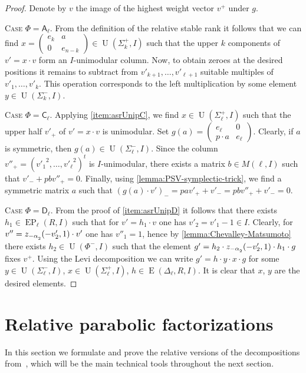 \documentclass[11pt]{amsart}
\theoremstyle{plain}
\numberwithin{equation}{section}
\numberwithin{lemma}{section}
\theoremstyle{definition}
\theoremstyle{remark}
\DeclareMathOperator{\E}{E}
\DeclareMathOperator{\EP}{EP}
\DeclareMathOperator{\U}{U}
\newcommand{\rA}{\mathsf{A}}
\newcommand{\rC}{\mathsf{C}}
\newcommand{\rD}{\mathsf{D}}
\def\ssub#1{\mathchoice
   {_{\lower2pt\hbox{$\scriptstyle #1$}}}
   {_{\lower2pt\hbox{$\scriptstyle #1$}}}
   {_{\lower1.5pt\hbox{$\scriptscriptstyle #1$}}}
   {_{\!\lower1.5pt\hbox{$\scriptscriptstyle #1$}}}}
\begin{document}
\begin{proof} Denote by $v$ the image of the highest weight vector $v^+$ under $g$.

\textsc{Case $\Phi=\rA_\ell$.} From the definition of the relative stable rank it follows that we can find 
$x= \left(\begin{smallmatrix} e_k & a \\ 0 & e_{n-k} \end{smallmatrix}\right) \in \U(\Sigma_k^+, I)$ such that 
the upper $k$ components of $v'= x \cdot v$ form an $I$-unimodular column. 
Now, to obtain zeroes at the desired positions it remains to subtract from $v'_{k+1},\ldots, v'_{\ell+1}$ suitable multiples of $v'_1, \ldots, v'_k$.
This operation corresponds to the left multiplication by some element $y\in\U(\Sigma_k^-, I)$.

\textsc{Case $\Phi=\rC_\ell$.} 
Applying \cref{item:asrUnipC}, we find $x \in \U(\Sigma_\ell^+, I)$ such that the upper half $v'_+$ of $v' = x \cdot v$ is unimodular.
Set $g(a) = \left(\begin{smallmatrix} e_\ell & 0 \\ p \cdot a & e_{\ell} \end{smallmatrix}\right)$.
Clearly, if $a$ is symmetric, then $g(a) \in \U(\Sigma_\ell^-, I)$.
Since the column $v''_+ = ({v'_1}^2, \ldots, {v'_\ell}^2)^t$ is $I$-unimodular, there exists a matrix $b \in M(\ell, I)$ such that $v'_- + p b v''_+ = 0$.
Finally, using \cref{lemma:PSV-symplectic-trick}, we find a symmetric matrix $a$ such that $(g(a) \cdot v')_- = p a v'_+ + v'_- = p b v''_+ + v'_- = 0$.

\textsc{Case $\Phi=\rD_\ell$.} From the proof of \cref{item:asrUnipD} it follows that there exists $h_1 \in \EP_\ell(R, I)$ such that for $v'=h_1\cdot v$ one has $v'_2=v'_1-1\in I$.
Clearly, for $v'' = z_{-\alpha\ssub{2}}(-v'_2, 1)\cdot v'$ one has $v''_1=1$, hence by \cref{lemma:Chevalley-Matsumoto} there exists $h_2 \in \U(\Phi^-, I)$ such that the element
$g'=h_2 \cdot z_{-\alpha\ssub{2}}(-v'_2, 1) \cdot h_1 \cdot g$ fixes $v^+$. 
Using the Levi decomposition we can write $g'=h \cdot y \cdot x \cdot g$ for some $y\in\U(\Sigma^-_\ell, I)$, $x \in \U(\Sigma^+_\ell, I)$, $h\in\E(\Delta_\ell, R, I)$.
It is clear that $x$, $y$ are the desired elements.
\end{proof}

\section{Relative parabolic factorizations} \label{sec:factorizations}
In this section we formulate and prove the relative versions of the decompositions from~\cite{St78}, which will be the main technical tools throughout the next section.
\end{document}
